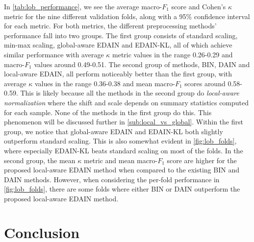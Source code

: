 \documentclass{statsmsc}
\begin{document}
{In \cref{tab:lob_performance}, we see the average macro-$F_1$ score and Cohen's $\kappa$ metric
for the nine different validation folds, along with a 95\% confidence interval for each metric.
For both metrics, the different preprocessing methods' performance fall into two groups.
The first group consists of standard scaling, min-max scaling, global-aware \ac{EDAIN} and
\ac{EDAIN-KL}, all of which achieve similar performance with average $\kappa$ metric values
in the range 0.26-0.29 and macro-$F_1$ values around 0.49-0.51. The second group of methods,
 \ac{BIN}, \ac{DAIN} and local-aware \ac{EDAIN}, all perform noticeably better than the
first group, with average $\kappa$ values in the range 0.36-0.38 and mean macro-$F_1$ scores around
0.58-0.59. This is likely because all the methods in the second group do
\textit{local-aware normalization} where the shift and scale depends on summary statistics computed
for each sample. None of the methods in the first group do this. This phenomenon will be
discussed further  in \cref{sub:local_vs_global}.
Within the first group, we notice that global-aware \ac{EDAIN} and \ac{EDAIN-KL} both slightly
outperform standard scaling. This is also somewhat evident in \cref{fig:lob_folds}, where
especially \ac{EDAIN-KL} beats standard scaling on most of the folds.
In the second group, the mean $\kappa$ metric and mean macro-$F_1$ score are higher for the
proposed local-aware \ac{EDAIN} method when compared to the existing \ac{BIN} and \ac{DAIN}
methods. However, when considering the per-fold performance in \cref{fig:lob_folds}, there are some
folds where either \ac{BIN} or \ac{DAIN} outperform the proposed local-aware \ac{EDAIN} method.


\section{Conclusion}%
\label{sec:Conclusion} %

}
\end{document}
